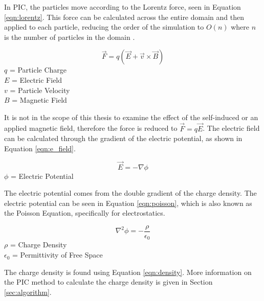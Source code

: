 \indent In PIC, the particles move according to the Lorentz force, seen in Equation \ref{eqn:lorentz}. This force can be calculated across the entire domain and then applied to each particle, reducing the order of the simulation to \(O(n)\) where \(n\) is the number of particles in the domain \cite{es-pic}. \par

\begin{equation}
    \label{eqn:lorentz}
    \vec{F} = q (\vec{E} + \vec{v}  \times \vec{B})
\end{equation}
\(q\) = Particle Charge \\
\(E\) = Electric Field \\
\(v\) = Particle Velocity \\
\(B\) = Magnetic Field \par

\indent It is not in the scope of this thesis to examine the effect of the self-induced or an applied magnetic field, therefore the force is reduced to \(\vec{F} = q \vec{E}\). The electric field can be calculated through the gradient of the electric potential, as shown in Equation \ref{eqn:e_field}. \par


\begin{equation}
    \label{eqn:e_field}
    \vec{E} = - \nabla \phi
\end{equation}
\(\phi\) = Electric Potential \par

\indent The electric potential comes from the double gradient of the charge density. The electric potential can be seen in Equation \ref{eqn:poisson}, which is also known as the Poisson Equation, specifically for electrostatics. \par

\begin{equation}
    \label{eqn:poisson}
    \nabla^2 \phi = - \frac{\rho}{\epsilon_0}
\end{equation}
\(\rho\) = Charge Density \\
\(\epsilon_0\) = Permittivity of Free Space \par

\indent The charge density is found using Equation \ref{eqn:density}. More information on the PIC method to calculate the charge density is given in Section \ref{sec:algorithm}. \par

